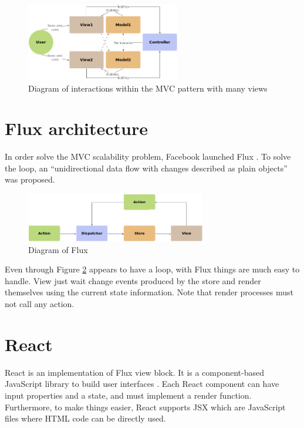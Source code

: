 \begin{figure}[htb]
	\begin{center}
		\includegraphics[width=0.6\textwidth]{./figures/mvc-complex.png}
		\caption{Diagram of interactions within the MVC pattern with many views}
		\label{F:mvc-complex}
	\end{center}
\end{figure}

\section{Flux architecture}

In order solve the MVC scalability problem, Facebook launched Flux
\cite{flux-web}. To solve the loop, an “unidirectional data flow with changes
described as plain objects” was proposed.

\begin{figure}[htb]
	\begin{center}
		\includegraphics[width=0.7\textwidth]{./figures/flux.png}
		\caption{Diagram of Flux}
		\label{F:flux}
	\end{center}
\end{figure}

Even through Figure \ref{F:flux} appears to have a loop, with Flux things are
much easy to handle. View just wait change events produced by the store and
render themselves using the current state information. Note that render
processes must not call any action.

\section{React}

React is an implementation of Flux view block. It is a component-based 
JavaScript library to build user interfaces \cite{react-web}. Each React
component can have input properties and a state, and must implement a render
function. Furthermore, to make things easier, React supports JSX which are
JavaScript files where HTML code can be directly used.


